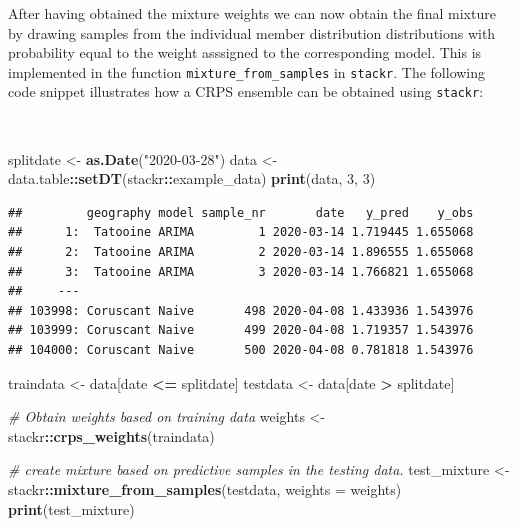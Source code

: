 \documentclass[
]{book}
\newenvironment{Shaded}{\begin{snugshade}}{\end{snugshade}}
\newcommand{\CommentTok}[1]{\textcolor[rgb]{0.56,0.35,0.01}{\textit{#1}}}
\newcommand{\DataTypeTok}[1]{\textcolor[rgb]{0.13,0.29,0.53}{#1}}
\newcommand{\DecValTok}[1]{\textcolor[rgb]{0.00,0.00,0.81}{#1}}
\newcommand{\KeywordTok}[1]{\textcolor[rgb]{0.13,0.29,0.53}{\textbf{#1}}}
\newcommand{\NormalTok}[1]{#1}
\newcommand{\OperatorTok}[1]{\textcolor[rgb]{0.81,0.36,0.00}{\textbf{#1}}}
\newcommand{\StringTok}[1]{\textcolor[rgb]{0.31,0.60,0.02}{#1}}
\begin{document}
After having obtained the mixture weights we can now obtain the final mixture by drawing samples from the individual member distribution distributions with probability equal to the weight asssigned to the corresponding model. This is implemented in the function \texttt{mixture\_from\_samples} in \texttt{stackr}. The following code snippet illustrates how a CRPS ensemble can be obtained using \texttt{stackr}:

\(~\)

\begin{Shaded}
\begin{Highlighting}[]
\NormalTok{splitdate \textless{}{-}}\StringTok{ }\KeywordTok{as.Date}\NormalTok{(}\StringTok{"2020{-}03{-}28"}\NormalTok{)}
\NormalTok{data \textless{}{-}}\StringTok{ }\NormalTok{data.table}\OperatorTok{::}\KeywordTok{setDT}\NormalTok{(stackr}\OperatorTok{::}\NormalTok{example\_data)}
\KeywordTok{print}\NormalTok{(data, }\DecValTok{3}\NormalTok{, }\DecValTok{3}\NormalTok{)}
\end{Highlighting}
\end{Shaded}

\begin{verbatim}
##         geography model sample_nr       date   y_pred    y_obs
##      1:  Tatooine ARIMA         1 2020-03-14 1.719445 1.655068
##      2:  Tatooine ARIMA         2 2020-03-14 1.896555 1.655068
##      3:  Tatooine ARIMA         3 2020-03-14 1.766821 1.655068
##     ---                                                       
## 103998: Coruscant Naive       498 2020-04-08 1.433936 1.543976
## 103999: Coruscant Naive       499 2020-04-08 1.719357 1.543976
## 104000: Coruscant Naive       500 2020-04-08 0.781818 1.543976
\end{verbatim}

\begin{Shaded}
\begin{Highlighting}[]
\NormalTok{traindata \textless{}{-}}\StringTok{ }\NormalTok{data[date }\OperatorTok{\textless{}=}\StringTok{ }\NormalTok{splitdate]}
\NormalTok{testdata \textless{}{-}}\StringTok{ }\NormalTok{data[date }\OperatorTok{\textgreater{}}\StringTok{ }\NormalTok{splitdate]}

\CommentTok{\# Obtain weights based on training data}
\NormalTok{weights \textless{}{-}}\StringTok{ }\NormalTok{stackr}\OperatorTok{::}\KeywordTok{crps\_weights}\NormalTok{(traindata)}

\CommentTok{\# create mixture based on predictive samples in the testing data. }
\NormalTok{test\_mixture \textless{}{-}}\StringTok{ }\NormalTok{stackr}\OperatorTok{::}\KeywordTok{mixture\_from\_samples}\NormalTok{(testdata, }\DataTypeTok{weights =}\NormalTok{ weights)}
\KeywordTok{print}\NormalTok{(test\_mixture)}
\end{Highlighting}
\end{Shaded}
\end{document}
